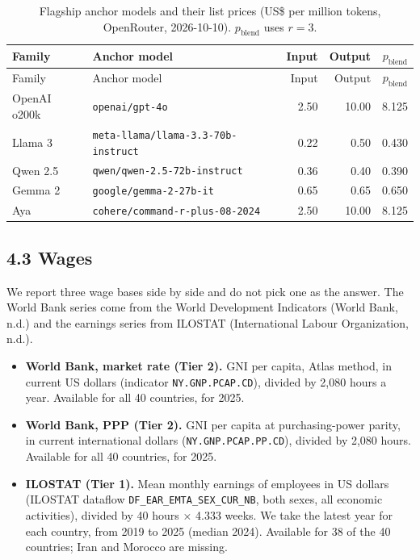 \documentclass[11pt]{article}
\providecommand{\tightlist}{\setlength{\itemsep}{0pt}\setlength{\parskip}{0pt}}
\begin{document}
\begin{longtable}[]{@{}llrrr@{}}
\caption{Flagship anchor models and their list prices (US\$ per million tokens, OpenRouter, 2026-10-10). \(p_{\text{blend}}\) uses \(r = 3\).}\tabularnewline
\toprule\noalign{}
Family & Anchor model & Input & Output & \(p_{\text{blend}}\) \\
\midrule\noalign{}
\endfirsthead
\toprule\noalign{}
Family & Anchor model & Input & Output & \(p_{\text{blend}}\) \\
\midrule\noalign{}
\endhead
\bottomrule\noalign{}
\endlastfoot
OpenAI o200k & \texttt{openai/gpt-4o} & 2.50 & 10.00 & 8.125 \\
Llama 3 & \texttt{meta-llama/llama-3.3-70b-instruct} & 0.22 & 0.50 & 0.430 \\
Qwen 2.5 & \texttt{qwen/qwen-2.5-72b-instruct} & 0.36 & 0.40 & 0.390 \\
Gemma 2 & \texttt{google/gemma-2-27b-it} & 0.65 & 0.65 & 0.650 \\
Aya & \texttt{cohere/command-r-plus-08-2024} & 2.50 & 10.00 & 8.125 \\
\end{longtable}

\subsection{4.3 Wages}

We report three wage bases side by side and do not pick one as the answer. The World Bank series come from the World Development Indicators (World Bank, n.d.) and the earnings series from ILOSTAT (International Labour Organization, n.d.).

\begin{itemize}
\tightlist
\item
  \textbf{World Bank, market rate (Tier 2).} GNI per capita, Atlas method, in current US dollars (indicator \texttt{NY.GNP.PCAP.CD}), divided by 2,080 hours a year. Available for all 40 countries, for 2025.
\item
  \textbf{World Bank, PPP (Tier 2).} GNI per capita at purchasing-power parity, in current international dollars (\texttt{NY.GNP.PCAP.PP.CD}), divided by 2,080 hours. Available for all 40 countries, for 2025.
\item
  \textbf{ILOSTAT (Tier 1).} Mean monthly earnings of employees in US dollars (ILOSTAT dataflow \texttt{DF\_EAR\_EMTA\_SEX\_CUR\_NB}, both sexes, all economic activities), divided by 40 hours × 4.333 weeks. We take the latest year for each country, from 2019 to 2025 (median 2024). Available for 38 of the 40 countries; Iran and Morocco are missing.
\end{itemize}
\end{document}
